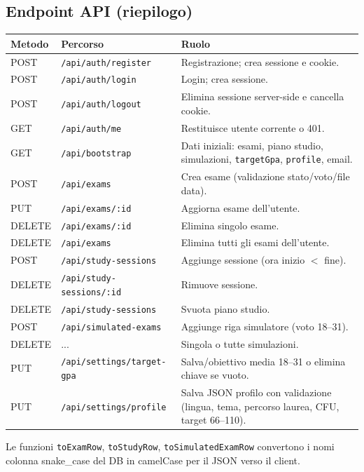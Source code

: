 \documentclass[11pt,a4paper]{article}
\begin{document}
\subsection{Endpoint API (riepilogo)}
\begin{center}
\begin{tabular}{@{}llp{7cm}@{}}
\toprule
\textbf{Metodo} & \textbf{Percorso} & \textbf{Ruolo} \\
\midrule
POST & \texttt{/api/auth/register} & Registrazione; crea sessione e cookie. \\
POST & \texttt{/api/auth/login} & Login; crea sessione. \\
POST & \texttt{/api/auth/logout} & Elimina sessione server-side e cancella cookie. \\
GET & \texttt{/api/auth/me} & Restituisce utente corrente o 401. \\
GET & \texttt{/api/bootstrap} & Dati iniziali: esami, piano studio, simulazioni, \texttt{targetGpa}, \texttt{profile}, email. \\
POST & \texttt{/api/exams} & Crea esame (validazione stato/voto/file data). \\
PUT & \texttt{/api/exams/:id} & Aggiorna esame dell'utente. \\
DELETE & \texttt{/api/exams/:id} & Elimina singolo esame. \\
DELETE & \texttt{/api/exams} & Elimina tutti gli esami dell'utente. \\
POST & \texttt{/api/study-sessions} & Aggiunge sessione (ora inizio $<$ fine). \\
DELETE & \texttt{/api/study-sessions/:id} & Rimuove sessione. \\
DELETE & \texttt{/api/study-sessions} & Svuota piano studio. \\
POST & \texttt{/api/simulated-exams} & Aggiunge riga simulatore (voto 18--31). \\
DELETE & ... & Singola o tutte simulazioni. \\
PUT & \texttt{/api/settings/target-gpa} & Salva/obiettivo media 18--31 o elimina chiave se vuoto. \\
PUT & \texttt{/api/settings/profile} & Salva JSON profilo con validazione (lingua, tema, percorso laurea, CFU, target 66--110). \\
\bottomrule
\end{tabular}
\end{center}

Le funzioni \texttt{toExamRow}, \texttt{toStudyRow}, \texttt{toSimulatedExamRow} convertono i nomi colonna snake\_case del DB in camelCase per il JSON verso il client.
\end{document}
